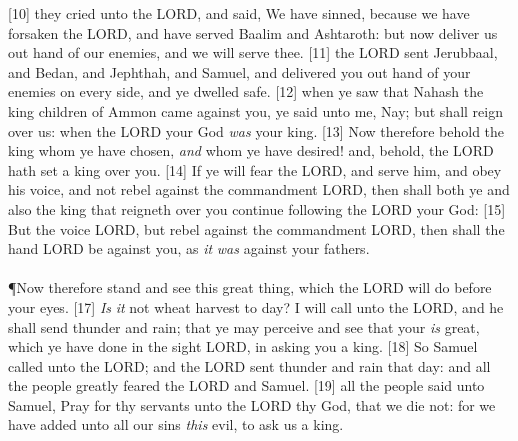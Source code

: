 [10] \textcolor[cmyk]{0.99998,1,0,0}{ they cried unto the LORD, and said, We have sinned, because we have forsaken the LORD, and have served Baalim and Ashtaroth: but now deliver us out  hand of our enemies, and we will serve thee.}
[11] \textcolor[cmyk]{0.99998,1,0,0}{ the LORD sent Jerubbaal, and Bedan, and Jephthah, and Samuel, and delivered you out  hand of your enemies on every side, and ye dwelled safe.}
[12] \textcolor[cmyk]{0.99998,1,0,0}{ when ye saw that Nahash the king  children of Ammon came against you, ye said unto me, Nay; but  shall reign over us: when the LORD your God \emph{was} your king.}
[13] \textcolor[cmyk]{0.99998,1,0,0}{Now therefore behold the king whom ye have chosen, \emph{and} whom ye have desired! and, behold, the LORD hath set a king over you.}
[14] \textcolor[cmyk]{0.99998,1,0,0}{If ye will fear the LORD, and serve him, and obey his voice, and not rebel against the commandment  LORD, then shall both ye and also the king that reigneth over you continue following the LORD your God:}
[15] \textcolor[cmyk]{0.99998,1,0,0}{But  the voice  LORD, but rebel against the commandment  LORD, then shall the hand  LORD be against you, as \emph{it} \emph{was} against your fathers.}\\
\\
\P \textcolor[cmyk]{0.99998,1,0,0}{Now therefore stand and see this great thing, which the LORD will do before your eyes.}
[17] \textcolor[cmyk]{0.99998,1,0,0}{\emph{Is} \emph{it} not wheat harvest to day? I will call unto the LORD, and he shall send thunder and rain; that ye may perceive and see that your  \emph{is} great, which ye have done in the sight  LORD, in asking you a king.}
[18] \textcolor[cmyk]{0.99998,1,0,0}{So Samuel called unto the LORD; and the LORD sent thunder and rain that day: and all the people greatly feared the LORD and Samuel.}
[19] \textcolor[cmyk]{0.99998,1,0,0}{ all the people said unto Samuel, Pray for thy servants unto the LORD thy God, that we die not: for we have added unto all our sins \emph{this} evil, to ask us a king.}\\
\\
